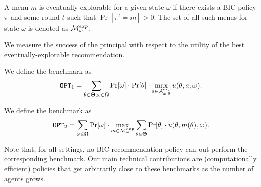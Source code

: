 \begin{definition}
	A menu $m$ is eventually-explorable for a given state $\omega$ if there exists a BIC policy $\pi$ and some round $t$ such that $\Pr[\pi^t= m]> 0$. The set of all such menus for state $\omega$ is denoted as $\mathcal{M}_{\omega}^{exp}$.
\end{definition}

We measure the success of the principal with respect to the utility of the best eventually-explorable recommendation.

\begin{definition}
	We define the benchmark as
	\[
	\mathtt{OPT}_1 = \sum_{\theta \in \bold{\Theta}, \omega\in \bold{\Omega}} \Pr[\omega] \cdot \Pr[\theta] \cdot \max_{a \in \mathcal{A}_{\omega,\theta}^{exp}} u(\theta, a, \omega).
	\]
\end{definition}

\begin{definition}
	We define the benchmark as
	\[
	\mathtt{OPT}_2 = \sum_{\omega\in \bold{\Omega}} \Pr[\omega] \cdot\max_{m \in \mathcal{M}_{\omega}^{exp}}\sum_{\theta \in \bold{\Theta}} \Pr[\theta] \cdot  u(\theta, m(\theta), \omega).
	\]
\end{definition}

Note that, for all settings, no BIC recommendation policy can out-perform the corresponding benchmark.  Our main technical contributions are (computationally efficient) policies that get arbitrarily close to these benchmarks as the number of agents grows.
